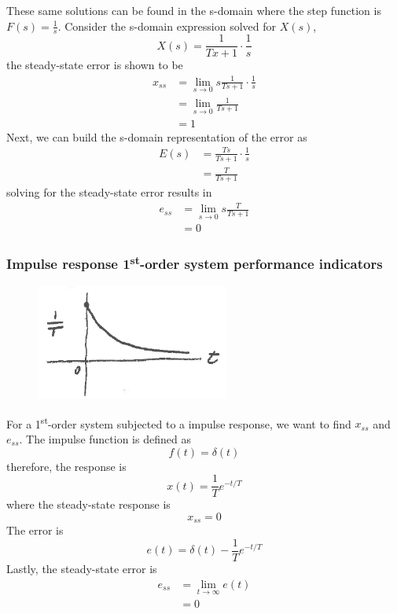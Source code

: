 \documentclass[12pt,letter]{article}
\begin{document}
These same solutions can be found in the s-domain where the step function is $F(s)=\frac{1}{s}$. Consider the s-domain expression solved for $X(s)$, 
\begin{equation}
X(s) = \frac{1}{Tx +1} \cdot \frac{1}{s} 
\end{equation}
the steady-state error is shown to be
\begin{align}
x_{ss} &= \lim\limits_{s \rightarrow 0} s \frac{1}{Ts+1} \cdot \frac{1}{s} \\
&= \lim\limits_{s \rightarrow 0} \frac{1}{Ts+1}   \nonumber \\
&= 1    \nonumber 
\end{align}
Next, we can build the s-domain representation of the error as
\begin{align}
E(s) &= \frac{Ts}{Ts +1} \cdot \frac{1}{s} \\
&= \frac{T}{Ts +1}  \nonumber 
\end{align}
solving for the steady-state error results in
\begin{align}
e_{ss} &= \lim\limits_{s \rightarrow 0}  s \frac{T}{Ts+1} \\
&= 0   \nonumber 
\end{align}

\subsubsection{Impulse response 1\textsuperscript{st}-order system performance indicators}

\begin{figure}[H]
	\centering
	\includegraphics[width=2.5in]{../figures/impulse_response_with_steady_state_error}
\end{figure}



For a 1\textsuperscript{st}-order system subjected to a impulse response, we want to find $x_{ss}$ and $e_{ss}$. The impulse function is defined as
\begin{equation}
f(t) = \delta(t)
\end{equation}
therefore, the response is
\begin{equation}
x(t) =\frac{1}{T} e^{-t/T}
\end{equation}
where the steady-state response is
\begin{equation}
x_{ss} = 0
\end{equation}
The error is
\begin{equation}
e(t) = \delta(t) - \frac{1}{T} e^{-t/T}
\end{equation}
Lastly, the steady-state error is
\begin{align}
e_{ss} &= \lim\limits_{t \rightarrow \infty}e(t) \\
&= 0 \nonumber
\end{align}
\end{document}
